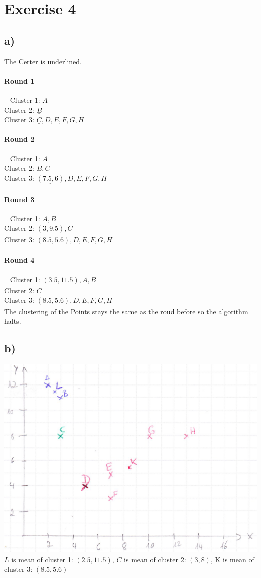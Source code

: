 \section*{Exercise 4}
\subsection*{a)}\small The Certer is underlined.\normalsize

\paragraph{Round 1}~\newline
Cluster 1: $\underline{A}$\\
Cluster 2: $\underline{B}$\\
Cluster 3: $\underline{C},D,E,F,G,H$

\paragraph{Round 2}~\newline
Cluster 1: $\underline{A}$\\
Cluster 2: $\underline{B},C$\\
Cluster 3: $\underline{(7.5,6)},D,E,F,G,H$

\paragraph{Round 3}~\newline
Cluster 1: $\underline{A},B$\\
Cluster 2: $\underline{(3,9.5)},C$\\
Cluster 3: $\underline{(8.5,5.6)},D,E,F,G,H$

\paragraph{Round 4}~\newline
Cluster 1: $\underline{(3.5,11.5)},A,B$\\
Cluster 2: $\underline{C}$\\
Cluster 3: $\underline{(8.5,5.6)},D,E,F,G,H$\\
The clustering of the Points stays the same as the roud before so the algorithm halts.

\subsection*{b)}
\begin{center}
  \includegraphics[width=0.7\linewidth]{E4_diag}\\
  \small $L$ is mean of cluster 1: $(2.5,11.5)$, $C$ is mean of cluster 2: $(3,8)$, K is mean of cluster 3: $(8.5,5.6)$
\end{center}
